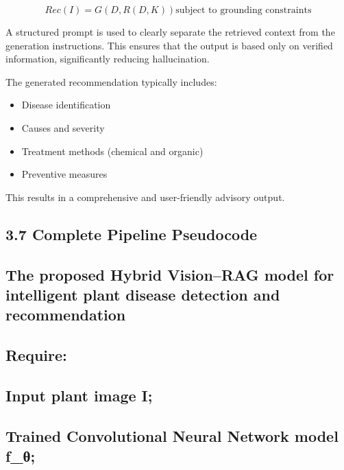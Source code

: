 \[Rec(I) = G(D,R(D,K))\text{subject to grounding constraints}
\]

A structured prompt is used to clearly separate the retrieved context
from the generation instructions. This ensures that the output is based
only on verified information, significantly reducing hallucination.

The generated recommendation typically includes:

\begin{itemize}
\item
  Disease identification
\item
  Causes and severity
\item
  Treatment methods (chemical and organic)
\item
  Preventive measures
\end{itemize}

This results in a comprehensive and user-friendly advisory output.

\subsection*{3.7 Complete Pipeline
Pseudocode}\label{complete-pipeline-pseudocode}

\subsection*{The proposed Hybrid Vision--RAG model for intelligent plant
disease detection and
recommendation}\label{the-proposed-hybrid-visionrag-model-for-intelligent-plant-disease-detection-and-recommendation}

\subsection*{Require:}\label{require}

\subsection*{Input plant image I;}\label{input-plant-image-i}

\subsection*{Trained Convolutional Neural Network model
f\_θ;}\label{trained-convolutional-neural-network-model-f_ux3b8}

